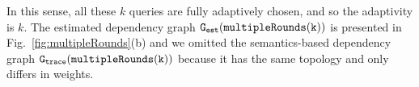 In this sense, all these $k$ queries are fully adaptively chosen, and so the adaptivity is $k$.
The estimated dependency graph $\mathtt{{G_{est}}}(\mathtt{multipleRounds(k)})$ is presented in Fig.~\ref{fig:multipleRounds}(b) and we omitted the semantics-based dependency graph $\mathtt{{G_{trace}}}(\mathtt{multipleRounds(k)})$ because it has the same topology and only differs in weights.
%
